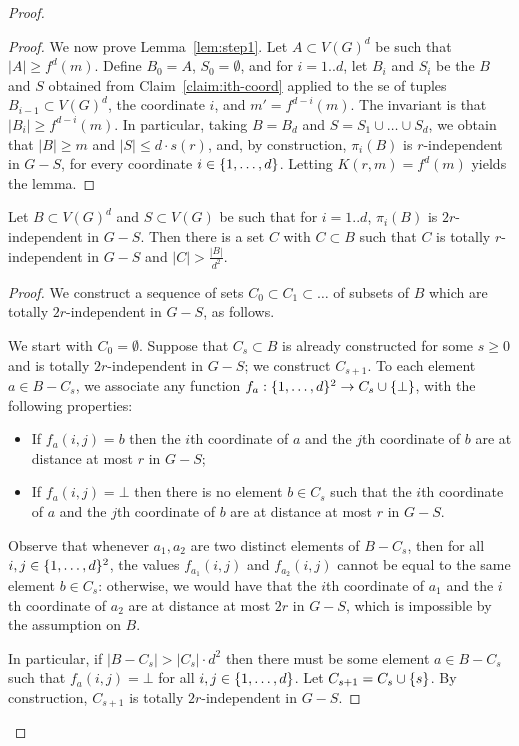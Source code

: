 \begin{proof}
\begin{proof}
We now prove Lemma~\ref{lem:step1}.
Let $A\subset V(G)^d$ be such that $|A|\ge f^d(m)$. 
Define $B_0=A$, $S_0=\emptyset$, and for $i=1..d$,
let $B_{i}$ and $S_i$ be the $B$ and $S$ obtained from  Claim~\ref{claim:ith-coord} applied to the se of tuples $B_{i-1}\subset V(G)^d$, the coordinate $i$, and $m'=f^{d-i}(m)$.  The invariant is that $|B_i|\ge f^{d-i}(m)$.
In particular, 
taking $B=B_d$ and $S=S_1\cup\ldots \cup S_d$, we obtain that $|B|\ge m$ and $|S|\le d\cdot s(r)$, and, by construction, $\pi_i(B)$
is $r$-independent in $G-S$, for every coordinate $i\in\{1,\ldots,d\}$. Letting $K(r,m)=f^d(m)$ yields the lemma.
\end{proof}


\begin{lemma}\label{lem:step2}
	Let $B\subset V(G)^d$ and $S\subset V(G)$ be such that for  $i=1..d$,
	$\pi_i(B)$ is $2r$-independent in $G-S$.
	Then there is a set $C$ with $C\subset B$ 
	such that $C$ is totally $r$-independent in $G-S$
	and $|C|> \frac{|B|}{d^2}$.
\end{lemma}
\begin{proof}
We construct a sequence of sets $C_0\subset C_1\subset \ldots$ of subsets of $B$ which are totally $2r$-independent in $G-S$, as follows.

We start with $C_0=\emptyset$. Suppose that $C_s\subset B$ is 
 already constructed for some $s\ge 0$
 and is totally $2r$-independent in $G-S$; we construct $C_{s+1}$.  To each element $a\in B-C_s$,
we associate any function $f_a:\{1,\ldots,d\}^2\to C_s\cup \{\bot\}$,
with the following properties:
\begin{itemize}
	\item If $f_a(i,j)=b$ then the $i$th coordinate of $a$
	and the $j$th coordinate of $b$ are at distance at most $r$
	in $G-S$;
	\item If $f_a(i,j)=\bot$ then there is no element $b\in C_s$ 
	such that the $i$th coordinate of $a$ and the $j$th coordinate of $b$ are at distance at most $r$ in $G-S$.	
\end{itemize}
Observe that whenever $a_1, a_2$ are two distinct elements of $B-C_s$,
then for all $i,j\in \{1,\ldots,d\}^2$, the values $f_{a_1}(i,j)$ and $f_{a_2}(i,j)$
cannot be equal to the same element $b\in C_s$:
otherwise, we would have that the $i$th coordinate of $a_1$
and the $i$th coordinate of $a_2$ are at distance at most $2r$
in $G-S$, which is impossible by the assumption on $B$.

In particular, if $|B-C_s|> |C_s|\cdot d^2$
then there must be some element  $a\in B-C_s$  
such that $f_a(i,j)=\bot$  for all $i,j\in\{1,\ldots,d\}$.
Let $C_{s+1}=C_s\cup \{s\}$.
By construction, $C_{s+1}$ is totally $2r$-independent in $G-S$.


\end{proof}
\end{proof}
